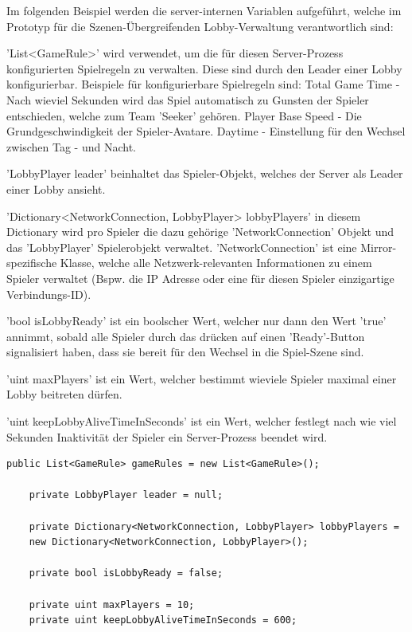 Im folgenden Beispiel werden die server-internen Variablen aufgeführt, welche im Prototyp für die Szenen-Übergreifenden Lobby-Verwaltung verantwortlich sind:

'List<GameRule>' wird verwendet, um die für diesen Server-Prozess konfigurierten Spielregeln zu verwalten. Diese sind durch den Leader einer Lobby konfigurierbar. Beispiele für konfigurierbare Spielregeln sind: 
Total Game Time - Nach wieviel Sekunden wird das Spiel automatisch zu Gunsten der Spieler entschieden, welche zum Team 'Seeker' gehören.
Player Base Speed - Die Grundgeschwindigkeit der Spieler-Avatare.
Daytime - Einstellung für den Wechsel zwischen Tag - und Nacht.

'LobbyPlayer leader' beinhaltet das Spieler-Objekt, welches der Server als Leader einer Lobby ansieht.

'Dictionary<NetworkConnection, LobbyPlayer> lobbyPlayers' in diesem Dictionary wird pro Spieler die dazu gehörige 'NetworkConnection' Objekt und das 'LobbyPlayer' Spielerobjekt verwaltet. 'NetworkConnection' ist eine Mirror-spezifische Klasse, welche alle Netzwerk-relevanten Informationen zu einem Spieler verwaltet (Bspw. die IP Adresse oder eine für diesen Spieler einzigartige Verbindungs-ID).

'bool isLobbyReady' ist ein boolscher Wert, welcher nur dann den Wert 'true' annimmt, sobald alle Spieler durch das drücken auf einen 'Ready'-Button signalisiert haben, dass sie bereit für den Wechsel in die Spiel-Szene sind.

'uint maxPlayers' ist ein Wert, welcher bestimmt wieviele Spieler maximal einer Lobby beitreten dürfen.

'uint keepLobbyAliveTimeInSeconds' ist ein Wert, welcher festlegt nach wie viel Sekunden Inaktivität der Spieler ein Server-Prozess beendet wird.

\begin{lstlisting}[caption= GameNetworkManager.cs Lobby Variables]
	public List<GameRule> gameRules = new List<GameRule>();
	
	private LobbyPlayer leader = null;
	
	private Dictionary<NetworkConnection, LobbyPlayer> lobbyPlayers = 
	new Dictionary<NetworkConnection, LobbyPlayer>();
	
	private bool isLobbyReady = false;
	
	private uint maxPlayers = 10;
	private uint keepLobbyAliveTimeInSeconds = 600;
\end{lstlisting}

